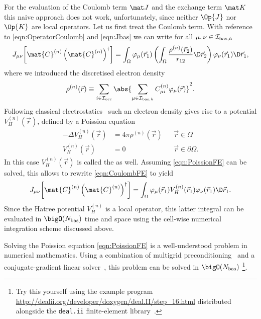 For the evaluation of the Coulomb term $\matJ$
and the exchange term $\matK$ this naive approach does not work,
unfortunately, since neither $\Op{J}$ nor $\Op{K}$ are local operators.
Let us first treat the Coulomb term.
With reference to \eqref{eqn:OperatorCoulomb} and \eqref{eqn:Jbas}
we can write
for all $\mu, \nu \in \mathcal{I}_{\text{bas},h}$
\begin{equation}
	\label{eqn:CoulombFE}
	J_{\mu\nu}\!\left[\mat{C}^{(n)}
		\left(\mat{C}^{(n)}\right)^\dagger\right]
	= \int_\Omega \varphi_\mu(\vec{r}_1)
	\left(\int_\Omega \frac{\rho^{(n)}(\vec{r}_2)}
		{ r_{12} }\D \vec{r}_2 \right)
	\varphi_\nu(\vec{r}_1) \D \vec{r}_1,
\end{equation}
where we introduced the discretised electron density
\begin{equation}
	\rho^{(n)}(\vec{r}) \equiv \sum_{i\in\Iocc} \abs{\sum_{\mu\in\Ibash} C^{(n)}_{\mu i} \varphi_\mu(\vec{r})}^2.
	\label{eqn:ElectronDensityFE}
\end{equation}
Following classical electrostatics~\cite{Jackson1999}
such an electron density gives rise to a potential $V^{(n)}_H(\vec{r})$,
defined by a Poission equation
\begin{equation}
\label{eqn:PoissionFE}
\begin{aligned}
	-\Delta V^{(n)}_H(\vec{r}) &= 4\pi \rho^{(n)}(\vec{r}) &&\vec{r} \in \Omega \\
	V^{(n)}_H(\vec{r}) &= 0 && \vec{r} \in \partial\Omega.
\end{aligned}
\end{equation}
In this case $V^{(n)}_H(\vec{r})$ is called the  as well.
Assuming \eqref{eqn:PoissionFE} can be solved,
this allows to rewrite \eqref{eqn:CoulombFE} to yield
\[
	J_{\mu\nu}\!\left[\mat{C}^{(n)}\left(\mat{C}^{(n)}\right)^\dagger\right]
	= \int_\Omega \varphi_\mu(\vec{r}_1) V^{(n)}_H(\vec{r}_1) \varphi_\nu(\vec{r}_1) \D \vec{r}_1.
\]
Since the Hatree potential $V^{(n)}_H$ is a local operator,
this latter integral can be evaluated in $\bigO(\Nbas)$
time and space using the cell-wise numerical integration scheme discussed above.

Solving the Poission equation \eqref{eqn:PoissionFE}
is a well-understood problem in numerical mathematics.
Using a combination of multigrid preconditioning~\cite{Hackbusch1985}
and a conjugate-gradient linear solver~\cite{Grossmann1992},
this problem can be solved in $\bigO(\Nbas)$%
\footnote{Try this yourself using the
	example program \url{http://dealii.org/developer/doxygen/deal.II/step_16.html}
	distributed alongside
	the \texttt{deal.ii} finite-element library~\cite{Arndt2017,Bangerth2007}.
}.

